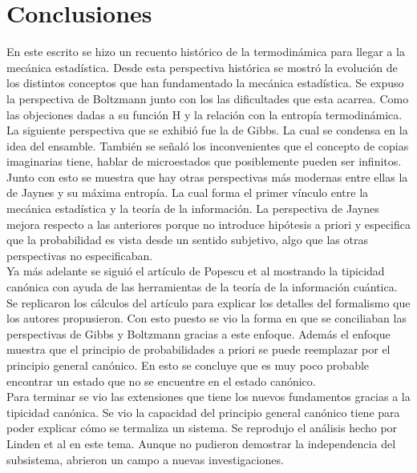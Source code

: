 \chapter{Conclusiones}

En este escrito se hizo un recuento histórico de la termodinámica para llegar a la mecánica estadística. Desde esta perspectiva histórica se mostró la evolución de los distintos conceptos que han fundamentado la mecánica estadística. Se expuso la perspectiva de Boltzmann junto con los las dificultades que esta acarrea. Como las objeciones dadas a su función H y la relación con la entropía termodinámica. La siguiente perspectiva que se exhibió fue la de Gibbs. La cual se condensa en la idea del ensamble. También se señaló los inconvenientes  que el concepto de copias imaginarias tiene, hablar de microestados que posiblemente pueden ser infinitos.\\
Junto con esto se muestra que hay otras perspectivas más modernas entre ellas la de Jaynes y su máxima entropía. La cual forma el primer vínculo entre la mecánica estadística y la teoría de la información. La perspectiva de Jaynes mejora respecto a las anteriores porque no introduce hipótesis a priori y especifica que la probabilidad es vista desde un sentido subjetivo, algo que las otras perspectivas no especificaban.
\\
Ya más adelante se siguió el artículo de Popescu et al  \cite{Popescu2006} mostrando la tipicidad canónica con ayuda de las herramientas de la teoría de la información cuántica. Se replicaron los cálculos del artículo para explicar los detalles del formalismo que los autores propusieron. Con esto puesto se vio la forma en que se conciliaban las perspectivas de Gibbs y Boltzmann gracias a este enfoque. Además el enfoque muestra que el principio de probabilidades a priori se puede reemplazar por el principio general canónico. En esto se concluye que es muy poco probable encontrar un estado que no se encuentre en el estado canónico.
\\
Para terminar se vio las extensiones que tiene los nuevos fundamentos gracias a la tipicidad canónica. Se vio la capacidad del principio general canónico tiene para poder explicar cómo se termaliza un sistema. Se reprodujo el análisis hecho por Linden et al \cite{LindenPaper} en este tema. Aunque no pudieron demostrar la independencia del subsistema, abrieron un campo a nuevas investigaciones.